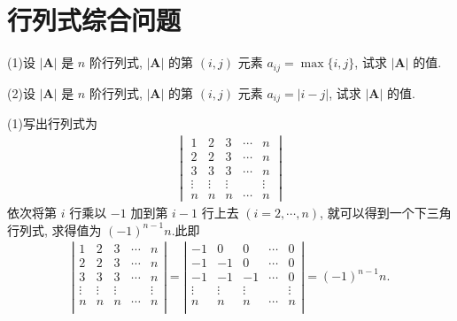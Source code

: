 \documentclass[../../main.tex]{subfiles}
\begin{document}
\section{行列式综合问题}

\begin{example}\label{example--经典行列式1}
(1)设 \(|\boldsymbol{A}|\) 是 \(n\) 阶行列式, \(|\boldsymbol{A}|\) 的第 \((i,j)\) 元素 \(a_{ij}=\max\{i,j\}\), 试求 \(|\boldsymbol{A}|\) 的值.
 
(2)设 \(|\boldsymbol{A}|\) 是 \(n\) 阶行列式, \(|\boldsymbol{A}|\) 的第 \((i,j)\) 元素 \(a_{ij}=|i - j|\), 试求 \(|\boldsymbol{A}|\) 的值.
\end{example}
\begin{solution}
(1)写出行列式为
\begin{align*}
\begin{vmatrix}
1 & 2 & 3 & \cdots & n \\
2 & 2 & 3 & \cdots & n \\
3 & 3 & 3 & \cdots & n \\
\vdots & \vdots & \vdots & & \vdots \\
n & n & n & \cdots & n
\end{vmatrix}
\end{align*}
依次将第 \(i\) 行乘以 \(-1\) 加到第 \(i - 1\) 行上去 \((i = 2,\cdots,n)\), 就可以得到一个下三角行列式, 求得值为 \((-1)^{n - 1}n\).此即
\begin{align*}
\left| \begin{matrix}
1&		2&		3&		\cdots&		n\\
2&		2&		3&		\cdots&		n\\
3&		3&		3&		\cdots&		n\\
\vdots&		\vdots&		\vdots&		&		\vdots\\
n&		n&		n&		\cdots&		n\\
\end{matrix} \right|=\left| \begin{matrix}
-1&		0&		0&		\cdots&		0\\
-1&		-1&		0&		\cdots&		0\\
-1&		-1&		-1&		\cdots&		0\\
\vdots&		\vdots&		\vdots&		&		\vdots\\
n&		n&		n&		\cdots&		n\\
\end{matrix} \right|=\left( -1 \right) ^{n-1}n.
\end{align*}


\end{solution}
\end{document}
